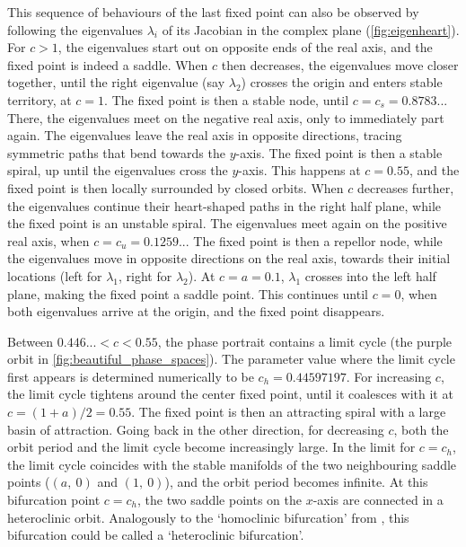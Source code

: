 This sequence of behaviours of the last fixed point can also be observed by following the eigenvalues $\lambda_i$ of its Jacobian in the complex plane (\cref{fig:eigenheart}). For $c > 1$, the eigenvalues start out on opposite ends of the real axis, and the fixed point is indeed a saddle. When $c$ then decreases, the eigenvalues move closer together, until the right eigenvalue (say $\lambda_2$) crosses the origin and enters stable territory, at $c = 1$. The fixed point is then a stable node, until $c = c_s = 0.8783..$. There, the eigenvalues meet on the negative real axis, only to immediately part again. The eigenvalues leave the real axis in opposite directions, tracing symmetric paths that bend towards the $y$-axis. The fixed point is then a stable spiral, up until the eigenvalues cross the $y$-axis. This happens at $c = 0.55$, and the fixed point is then locally surrounded by closed orbits. When $c$ decreases further, the eigenvalues continue their heart-shaped paths in the right half plane, while the fixed point is an unstable spiral. The eigenvalues meet again on the positive real axis, when $c = c_u = 0.1259..$. The fixed point is then a repellor node, while the eigenvalues move in opposite directions on the real axis, towards their initial locations (left for $\lambda_1$, right for $\lambda_2$). At $c = a = 0.1$, $\lambda_1$ crosses into the left half plane, making the fixed point a saddle point. This continues until $c = 0$, when both eigenvalues arrive at the origin, and the fixed point disappears.

Between $0.446... < c < 0.55$, the phase portrait contains a limit cycle (the purple orbit in \cref{fig:beautiful_phase_spaces}). The parameter value where the limit cycle first appears is determined numerically to be $c_h =0.44597197$. For increasing $c$, the limit cycle tightens around the center fixed point, until it coalesces with it at $c = (1+a)/2 = 0.55$. The fixed point is then an attracting spiral with a large basin of attraction. Going back in the other direction, for decreasing $c$, both the orbit period and the limit cycle become increasingly large. In the limit for $c = c_h$, the limit cycle coincides with the stable manifolds of the two neighbouring saddle points ($(a,\ 0)$ and $(1,\ 0)$), and the orbit period becomes infinite. At this bifurcation point $c = c_h$, the two saddle points on the $x$-axis are connected in a heteroclinic orbit. Analogously to the `homoclinic bifurcation' from , this bifurcation could be called a `heteroclinic bifurcation'.

\begin{figure}
\label{fig:lc_sims}
\end{figure}


